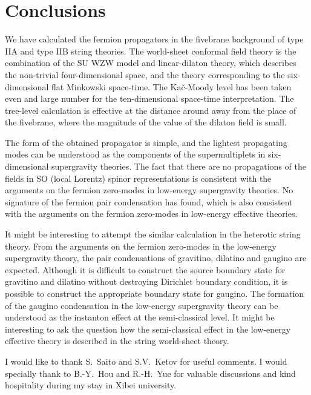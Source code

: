 \documentclass[a4paper,prd,preprint]{revtex4}
\begin{document}
\section{Conclusions}
\label{sec:conclusions}

We have calculated the fermion propagators
 in the fivebrane background of type IIA and type IIB string theories.
The world-sheet conformal field theory is the combination of
 the SU\coordHE{} WZW model and linear-dilaton theory,
 which describes the non-trivial four-dimensional space,
 and the theory corresponding to the six-dimensional
 flat Minkowski space-time.
The Ka\v c-Moody level \coordHE{}
 has been taken even and large number
 for the ten-dimensional space-time interpretation.
The tree-level calculation is effective
 at the distance around \coordHE{} away
 from the place of the fivebrane,
 where the magnitude of the value of the dilaton field is small.

The form of the obtained propagator is simple,
 and the lightest propagating modes can be understood
 as the components of the supermultiplets in six-dimensional
 \coordHE{} supergravity theories.
The fact that
 there are no propagations of the fields
 in SO\coordHE{} (local Lorentz) spinor representations
 is consistent with the arguments on the fermion zero-modes
 in low-energy supergravity theories.
No signature of the fermion pair condensation has found,
 which is also consistent with the arguments on the fermion zero-modes
 in low-energy effective theories.

It might be interesting
 to attempt the similar calculation in the heterotic string theory.
From the arguments
 on the fermion zero-modes in the low-energy supergravity theory,
 the pair condensations of gravitino, dilatino and gaugino
 are expected.
Although it is difficult to construct
 the source boundary state for gravitino and dilatino
 without destroying Dirichlet boundary condition,
 it is possible to construct the appropriate boundary state
 for gaugino.
The formation of the gaugino condensation
 in the low-energy supergravity theory can be understood
 as the instanton effect at the semi-classical level.
It might be interesting to ask the question
 how the semi-classical effect in the low-energy effective theory
 is described in the string world-sheet theory. 

\acknowledgments

I would like to thank
 S.~Saito and S.V.~Ketov for useful comments.
I would specially thank to B.-Y.~Hou and R.-H.~Yue
 for valuable discussions and kind hospitality
 during my stay in Xibei university.
\end{document}
